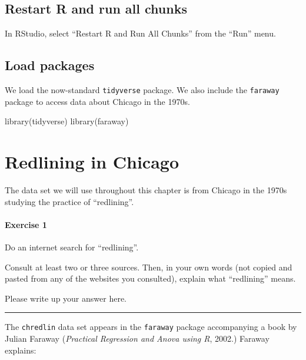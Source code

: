 \documentclass[
]{book}
\newenvironment{Shaded}{\begin{snugshade}}{\end{snugshade}}
\newcommand{\FunctionTok}[1]{\textcolor[rgb]{0.00,0.00,0.00}{#1}}
\newcommand{\NormalTok}[1]{#1}
\begin{document}
\hypertarget{correlation-restart}{%
\subsection{Restart R and run all chunks}\label{correlation-restart}}

In RStudio, select ``Restart R and Run All Chunks'' from the ``Run'' menu.

\hypertarget{correlation-load}{%
\subsection{Load packages}\label{correlation-load}}

We load the now-standard \texttt{tidyverse} package. We also include the \texttt{faraway} package to access data about Chicago in the 1970s.

\begin{Shaded}
\begin{Highlighting}[]
\FunctionTok{library}\NormalTok{(tidyverse)}
\FunctionTok{library}\NormalTok{(faraway)}
\end{Highlighting}
\end{Shaded}

\hypertarget{correlation-redlining}{%
\section{Redlining in Chicago}\label{correlation-redlining}}

The data set we will use throughout this chapter is from Chicago in the 1970s studying the practice of ``redlining''.

\hypertarget{exercise-1-3}{%
\paragraph*{Exercise 1}\label{exercise-1-3}}

Do an internet search for ``redlining''.

Consult at least two or three sources. Then, in your own words (not copied and pasted from any of the websites you consulted), explain what ``redlining'' means.

Please write up your answer here.

\begin{center}\rule{0.5\linewidth}{0.5pt}\end{center}

The \texttt{chredlin} data set appears in the \texttt{faraway} package accompanying a book by Julian Faraway (\emph{Practical Regression and Anova using R}, 2002.) Faraway explains:
\end{document}
